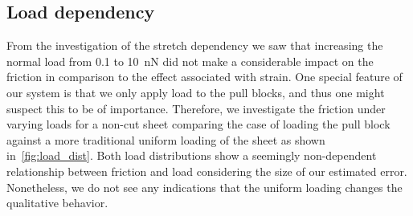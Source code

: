 

\subsection{Load dependency}\label{sec:load_dependency}
From the investigation of the stretch dependency we saw that increasing the normal load from 0.1 to \SI{10}{nN} did not make a considerable impact on the friction in comparison to the effect associated with strain. One special feature of our system is that we only apply load to the pull blocks, and thus one might suspect this to be of importance. Therefore, we investigate the friction under varying loads for a non-cut sheet comparing the case of loading the pull block against a more traditional uniform loading of the sheet as shown in~\cref{fig:load_dist}. Both load distributions show a seemingly non-dependent relationship between friction and load considering the size of our estimated error. Nonetheless, we do not see any indications that the uniform loading changes the qualitative behavior.

